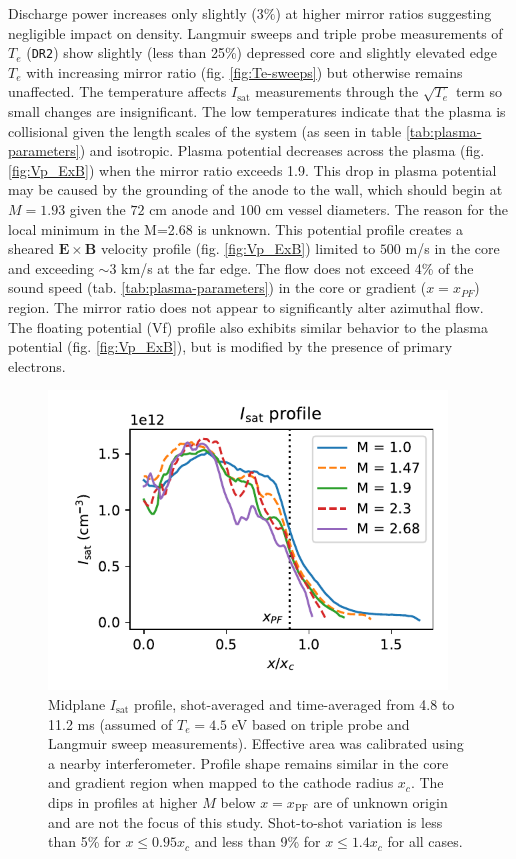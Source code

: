 Discharge power increases only slightly ($3\%$) at higher mirror ratios suggesting negligible impact on density. Langmuir sweeps and triple probe measurements of $T_e$ (\texttt{DR2}) show slightly (less than 25\%) depressed core and slightly elevated edge $T_e$ with increasing mirror ratio (fig. \ref{fig:Te-sweeps}) but otherwise remains unaffected. The temperature affects $I_\text{sat}$ measurements through the $\sqrt{T_e}$ term so small changes are insignificant. The low temperatures indicate that the plasma is collisional given the length scales of the system (as seen in table \ref{tab:plasma-parameters}) and isotropic. Plasma potential decreases across the plasma (fig. \ref{fig:Vp_ExB}) when the mirror ratio exceeds 1.9. This drop in plasma potential may be caused by the grounding of the anode to the wall, which should begin at $M=1.93$ given the $72$ cm anode and $100$ cm vessel diameters. The reason for the local minimum in the M=2.68 is unknown. This potential profile creates a sheared $\boldsymbol{E \times B}$ velocity profile (fig. \ref{fig:Vp_ExB}) limited to $500$ m/s in the core and exceeding $\sim 3$ km/s at the far edge. The flow does not exceed 4\% of the sound speed (tab. \ref{tab:plasma-parameters}) in the core or gradient ($x=x_{PF}$) region. The mirror ratio does not appear to significantly alter azimuthal flow. The floating potential (Vf) profile also exhibits similar behavior to the plasma potential (fig. \ref{fig:Vp_ExB}), but is modified by the presence of primary electrons. 



\begin{figure}
    \centering
    \includegraphics[width=300pt]{figures/fig3.pdf}
    \caption{Midplane $I_\text{sat}$ profile, shot-averaged and time-averaged from 4.8 to 11.2 ms (assumed of $T_e = 4.5$ eV based on triple probe and Langmuir sweep measurements). Effective area was calibrated using a nearby interferometer. Profile shape remains similar in the core and gradient region when mapped to the cathode radius $x_c$. The dips in profiles at higher $M$ below $x=x_\text{PF}$ are of unknown origin and are not the focus of this study. Shot-to-shot variation is less than 5\% for $x \leq 0.95 x_c$ and less than 9\% for $x \leq 1.4 x_c$ for all cases.}
    \label{fig:isat_profile}
\end{figure}

